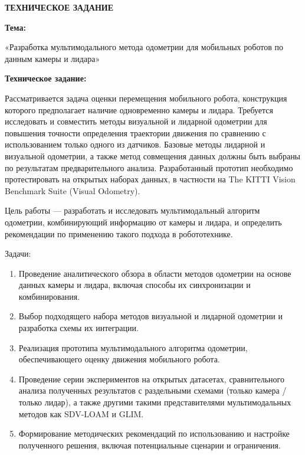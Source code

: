 \begin{center}
  \textbf{\large ТЕХНИЧЕСКОЕ ЗАДАНИЕ}
\end{center}

\textbf{Тема:}

«Разработка мультимодального метода одометрии для мобильных роботов по данным камеры и лидара»

\textbf{Техническое задание:}

Рассматривается задача оценки перемещения мобильного робота, конструкция которого предполагает наличие одновременно камеры и лидара. Требуется исследовать и совместить методы визуальной и лидарной одометрии для повышения точности определения траектории движения по сравнению с использованием только одного из датчиков. Базовые методы лидарной и визуальной одометрии, а также метод совмещения данных должны быть выбраны по результатам предварительного анализа. Разработанный прототип необходимо протестировать на открытых наборах данных, в частности на The KITTI Vision Benchmark Suite (Visual Odometry).

Цель работы — разработать и исследовать мультимодальный алгоритм одометрии, комбинирующий информацию от камеры и лидара, и определить рекомендации по применению такого подхода в робототехнике.

Задачи:
\begin{enumerate}
  \item Проведение аналитического обзора в области методов одометрии на основе данных камеры и лидара, включая способы их синхронизации и комбинирования.
  \item Выбор подходящего набора методов визуальной и лидарной одометрии и разработка схемы их интеграции.
  \item Реализация прототипа мультимодального алгоритма одометрии, обеспечивающего оценку движения мобильного робота.
  \item Проведение серии экспериментов на открытых датасетах, сравнительного анализа полученных результатов с раздельными схемами (только камера / только лидар), а также другими такими представителями мультимодальных методов как SDV-LOAM и GLIM.
  \item Формирование методических рекомендаций по использованию и настройке полученного решения, включая потенциальные сценарии и ограничения.
\end{enumerate}

